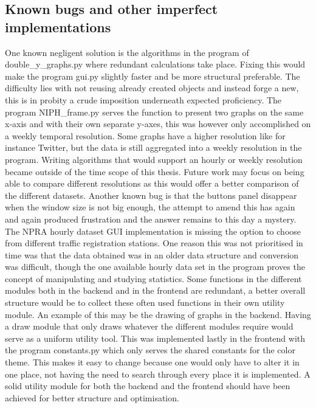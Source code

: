\subsection{Known bugs and other imperfect implementations}
One known negligent solution is the algorithms in the program of double\_y\_graphs.py where redundant calculations take place. Fixing this would make the program gui.py slightly faster and be more structural preferable. The difficulty lies with not reusing already created objects and instead forge a new, this is in probity a crude imposition underneath expected proficiency.
The program NIPH\_frame.py serves the function to present two graphs on the same x-axis and with their own separate y-axes, this was however only accomplished on a weekly temporal resolution. Some graphs have a higher resolution like for instance Twitter, but the data is still aggregated into a weekly resolution in the program. Writing algorithms that would support an hourly or weekly resolution became outside of the time scope of this thesis. Future work may focus on being able to compare different resolutions as this would offer a better comparison of the different datasets.
Another known bug is that the buttons panel disappear when the window size is not big enough, the attempt to amend this has again and again produced frustration and the answer remains to this day a mystery.
The NPRA hourly dataset GUI implementation is missing the option to choose from different traffic registration stations. One reason this was not prioritised in time was that the data obtained was in an older data structure and conversion was difficult, though the one available hourly data set in the program proves the concept of manipulating and studying statistics.
Some functions in the different modules both in the backend and in the frontend are redundant, a better overall structure would be to collect these often used functions in their own utility module. An example of this may be the drawing of graphs in the backend. Having a draw module that only draws whatever the different modules require would serve as a uniform utility tool. This was implemented lastly in the frontend with the program constants.py which only serves the shared constants for the color theme. This makes it easy to change because one would only have to alter it in one place, not having the need to search through every place it is implemented. A solid utility module for both the backend and the frontend should have been achieved for better structure and optimisation.

